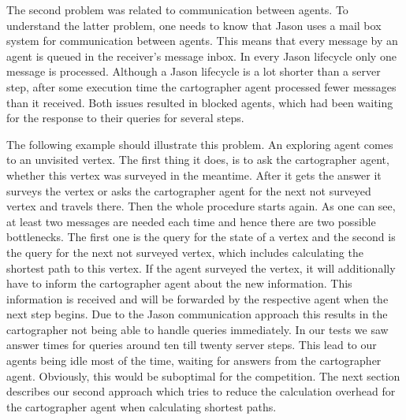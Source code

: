 The second problem was related to communication between agents.
To understand the latter problem, one needs to know that Jason uses a mail box system for communication between agents.
This means that every message by an agent is queued in the receiver's message inbox.
In every Jason lifecycle only one message is processed.
Although a Jason lifecycle is a lot shorter than a server step, after some execution time the cartographer agent processed fewer messages than it received.
Both issues resulted in blocked agents, which had been waiting for the response to their queries for several steps.

The following example should illustrate this problem.
An exploring agent comes to an unvisited vertex.
The first thing it does, is to ask the cartographer agent, whether this vertex was surveyed in the meantime.
After it gets the answer it surveys the vertex or asks the cartographer agent for the next not surveyed vertex and travels there.
Then the whole procedure starts again.
As one can see, at least two messages are needed each time and hence there are two possible bottlenecks.
The first one is the query for the state of a vertex and the second is the query for the next not surveyed vertex, which includes calculating the shortest path to this vertex.
If the agent surveyed the vertex, it will additionally have to inform the cartographer agent about the new information.
This information is received and will be forwarded by the respective agent when the next step begins.
Due to the Jason communication approach this results in the cartographer not being able to handle queries immediately.
In our tests we saw answer times for queries around ten till twenty server steps.
This lead to our agents being idle most of the time, waiting for answers from the cartographer agent.
Obviously, this would be suboptimal for the competition.
The next section describes our second approach which tries to reduce the calculation overhead for the cartographer agent when calculating shortest paths.

